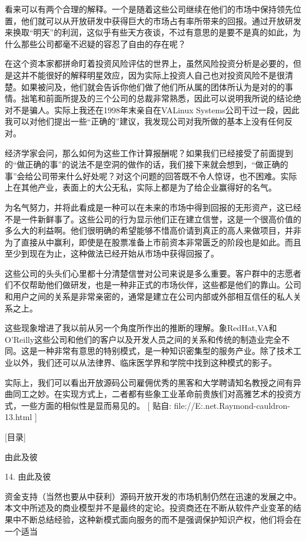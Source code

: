 \documentclass[a4paper,12pt,UTF8,twoside]{ctexbook}
\begin{document}
看来可以有两个合理的解释。一个是随着这些公司继续在他们的市场中保持领先位置，他们就可以从开放研发中获得巨大的市场占有率所带来的回报。通过开放研发来换取“明天”的利润，这似乎有些天方夜谈，不过有意思的是要不是真的如此，为什么那些公司都毫不迟疑的容忍了自由的存在呢？


在这个资本家都拼命盯着投资风险评估的世界上，虽然风险投资分析是必要的，但是这并不能很好的解释明星效应，因为实际上投资人自己也对投资风险不是很清楚。如果被问及，他们就会告诉你他们做了他们所从属的团体所认为是对的的事情。拙笔和前面所提及的三个公司的总裁非常熟悉，因此可以说明我所说的结论绝对不是骗人。实际上我还在1998年末亲自在VALinux Systems公司干过一段，因此我可以对他们提出一些“正确的”建议，我发现公司对我所做的基本上没有任何反对。


经济学家会问，那么如何为这些工作计算报酬呢？如果我们已经接受了前面提到的“做正确的事”的说法不是空洞的做作的话，我们接下来就会想到，“做正确的事”会给公司带来什么好处呢？对这个问题的回答既不令人惊讶，也不困难。实际上在其他产业，表面上的大公无私，实际上都是为了给企业赢得好的名气。


为名气努力，并将此看成是一种可以在未来的市场中得到回报的无形资产，这已经不是一件新鲜事了。这些公司的行为显示他们正在建立信誉，这是一个很高价值的多么大的利益啊。他们很明确的希望能够不惜高价请到真正的高人来做项目，并非为了直接从中赢利，即使是在股票准备上市前资本非常匮乏的阶段也是如此。而且至少到现在为止，这种做法已经开始从市场中获得回报了。


这些公司的头头们心里都十分清楚信誉对公司来说是多么重要。客户群中的志愿者们不仅帮助他们做研发，也是一种非正式的市场伙伴，这些都是他们的靠山。公司和用户之间的关系是非常亲密的，通常是建立在公司内部或外部相互信任的私人关系之上。


这些现象增进了我以前从另一个角度所作出的推断的理解。象RedHat,VA和O'Reilly这些公司和他们的客户以及开发人员之间的关系和传统的制造业完全不同。这是一种非常有意思的特别模式，是一种知识密集型的服务产业。除了技术工业以外，我们还可以从法律界、临床医学界和学院中找到这种模式的影子。


实际上，我们可以看出开放源码公司雇佣优秀的黑客和大学聘请知名教授之间有异曲同工之妙。在实现方式上，二者都有些象工业革命前贵族们对高雅艺术的投资方式，一些方面的相似性是显而易见的。
[ 贴自: file://E:\joyfire\joyfire.net\bible\Eric.Raymond\magic-cauldron-13.html ]

[目录]

由此及彼

14. 由此及彼

资金支持（当然也要从中获利）源码开放开发的市场机制仍然在迅速的发展之中。本文中所述及的商业模型并不是最终的定论。投资商还在不断从软件产业变革的结果中不断总结经验，这种新模式面向服务的而不是强调保护知识产权，他们将会在一个适当
\end{document}
